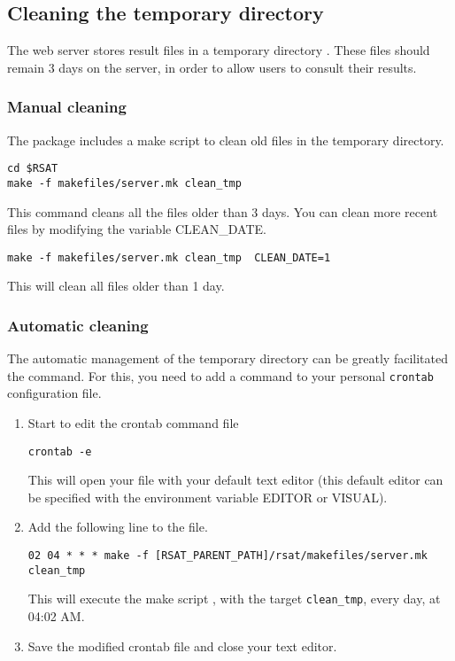 \documentclass[12pt,a4paper, twoside]{scrreprt} %
\begin{document}
\subsection{Cleaning the temporary directory}

The web server stores result files in a temporary directory
. These files should remain 3 days on
the server, in order to allow users to consult their results.

\subsubsection{Manual cleaning}

The \RSAT package includes a make script to clean old files in the
temporary directory.

\begin{lstlisting}
cd $RSAT
make -f makefiles/server.mk clean_tmp
\end{lstlisting}

This command cleans all the files older than 3 days. You can clean
more recent files by modifying the variable CLEAN\_DATE.

\begin{lstlisting}
make -f makefiles/server.mk clean_tmp  CLEAN_DATE=1
\end{lstlisting}

This will clean all files older than 1 day.

\subsubsection{Automatic cleaning}

The automatic management of the temporary directory can be greatly
facilitated the  command. For this, you need to add a
command to your personal \texttt{crontab} configuration file.

\begin{enumerate}
\item Start to edit the crontab command file

\begin{lstlisting}
crontab -e
\end{lstlisting}

This will open your  file with your default text editor
(this default editor can be specified with the environment variable
EDITOR or VISUAL).

\item Add the following line to the  file. 

\begin{lstlisting}
02 04 * * * make -f [RSAT_PARENT_PATH]/rsat/makefiles/server.mk clean_tmp
\end{lstlisting}

This will execute the make script , with the target
\texttt{clean\_tmp}, every day, at 04:02 AM. 

\item Save the modified crontab file and close your text editor.

\end{enumerate}
\end{document}
